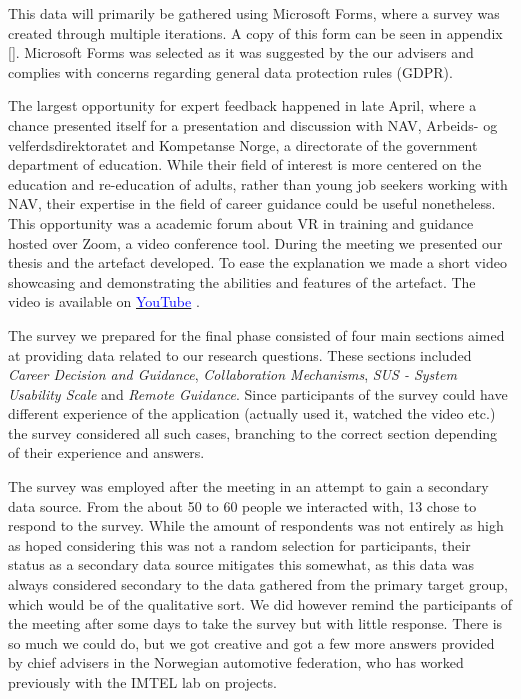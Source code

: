 This data will primarily be gathered using Microsoft Forms, where a survey was created through multiple iterations. A copy of this form can be seen in appendix \ref{}. Microsoft Forms was selected as it was suggested by the our advisers and complies with concerns regarding general data protection rules (GDPR).

The largest opportunity for expert feedback happened in late April, where a chance presented itself for a presentation and discussion with NAV, Arbeids- og velferdsdirektoratet and Kompetanse Norge, a directorate of the government department of education. While their field of interest is more centered on the education and re-education of adults, rather than young job seekers working with NAV, their expertise in the field of career guidance could be useful nonetheless.
This opportunity was a academic forum about VR in training and guidance hosted over Zoom, a video conference tool. During the meeting we presented our thesis and the artefact developed. To ease the explanation we made a short video showcasing and demonstrating the abilities and features of the artefact. The video is available on  \href{https://www.youtube.com/watch?v=ZNnK4ohWSag}{\textcolor{blue}{YouTube}} . 

The survey we prepared for the final phase consisted of four main sections aimed at providing data related to our research questions. These sections included \textit{Career Decision and Guidance}, \textit{Collaboration Mechanisms}, \textit{SUS - System Usability Scale} and \textit{Remote Guidance}. Since participants of the survey could have different experience of the application (actually used it, watched the video etc.) the survey considered all such cases, branching to the correct section depending of their experience and answers. 

The survey was employed after the meeting in an attempt to gain a secondary data source. From the about 50 to 60 people we interacted with, 13 chose to respond to the survey. While the amount of respondents was not entirely as high as hoped considering this was not a random selection for participants, their status as a secondary data source mitigates this somewhat, as this data was always considered secondary to the data gathered from the primary target group, which would be of the qualitative sort. We did however remind the participants of the meeting after some days to take the survey but with little response. There is so much we could do, but we got creative and got a few more answers provided by chief advisers in the Norwegian automotive federation, who has worked previously with the IMTEL lab on projects.    




